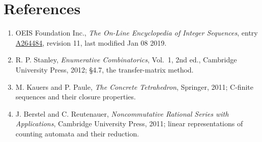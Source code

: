 \documentclass[11pt]{article}
\theoremstyle{definition}
\begin{document}
\section{References}

\begin{enumerate}

\item OEIS Foundation Inc., \emph{The On-Line Encyclopedia of Integer Sequences}, entry \href{https://oeis.org/A264484}{A264484}, revision 11, last modified Jan 08 2019.

\item R. P. Stanley, \emph{Enumerative Combinatorics}, Vol.~1, 2nd ed., Cambridge University Press, 2012; \S4.7, the transfer-matrix method.

\item M. Kauers and P. Paule, \emph{The Concrete Tetrahedron}, Springer, 2011; C-finite sequences and their closure properties.

\item J. Berstel and C. Reutenauer, \emph{Noncommutative Rational Series with Applications}, Cambridge University Press, 2011; linear representations of counting automata and their reduction.

\end{enumerate}
\end{document}
